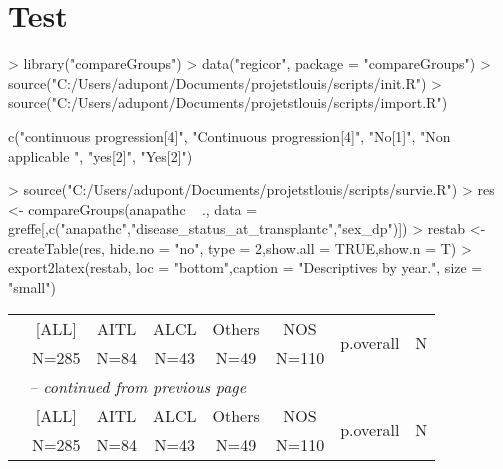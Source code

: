 \documentclass{article}
\begin{document}


\section*{Test}
\begin{Schunk}
\begin{Sinput}
> library("compareGroups")
> data("regicor", package = "compareGroups")
> source("C:/Users/adupont/Documents/projetstlouis/scripts/init.R")
> source("C:/Users/adupont/Documents/projetstlouis/scripts/import.R")
\end{Sinput}
c("continuous progression[4]", "Continuous progression[4]", "No[1]", 
"Non applicable ", "yes[2]", "Yes[2]")\begin{Sinput}
> source("C:/Users/adupont/Documents/projetstlouis/scripts/survie.R")
> res <- compareGroups(anapathc ~ ., data = greffe[,c("anapathc","disease_status_at_transplantc","sex_dp")])
> restab <- createTable(res, hide.no = "no", type = 2,show.all = TRUE,show.n = T)
> export2latex(restab, loc = "bottom",caption = "Descriptives by year.", size = "small")
\end{Sinput}
\begin{small}    
    \begin{longtable}{lccccccc}
    \hline  
     &    [ALL]    &    AITL    &    ALCL    &   Others   &    NOS     & \multirow{2}{*}{p.overall} & \multirow{2}{*}{ N }\\ 
 &    N=285    &    N=84    &    N=43    &    N=49    &   N=110    &           &     \\ 
  
    \hline
    \hline     
    \endfirsthead 
    \multicolumn{8}{l}{\tablename\ \thetable{} \textit{-- continued from previous page}}\\ 
    \hline
     &    [ALL]    &    AITL    &    ALCL    &   Others   &    NOS     & \multirow{2}{*}{p.overall} & \multirow{2}{*}{ N }\\ 
 &    N=285    &    N=84    &    N=43    &    N=49    &   N=110    &           &     \\ 


\end{longtable}
\end{small}
\end{Schunk}
\end{document}
